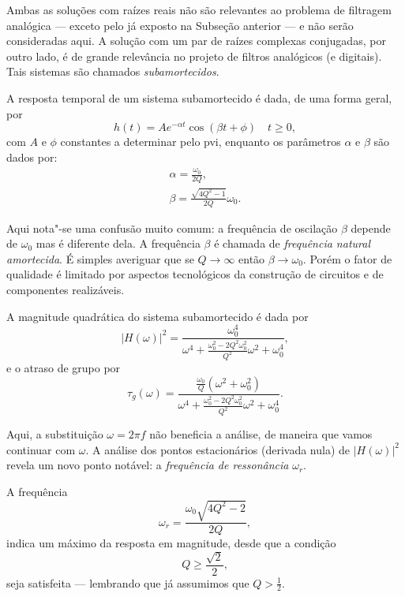 Ambas as soluções com raízes reais não são relevantes ao problema de filtragem analógica --- exceto pelo já exposto na Subseção anterior --- e não serão consideradas aqui. A solução com um par de raízes complexas conjugadas, por outro lado, é de grande relevância no projeto de filtros analógicos (e digitais). Tais sistemas são chamados \emph{subamortecidos}.

A resposta temporal de um sistema subamortecido é dada, de uma forma geral, por
\begin{equation}
	h(t)=Ae^{-\alpha t}\cos(\beta t+\phi)\quad t\geq0,
\end{equation}
com $A$ e $\phi$ constantes a determinar pelo \ac{pvi}, enquanto os parâmetros $\alpha$ e $\beta$ são dados por:
\begin{gather}
	\alpha=\frac{\omega_0}{2Q},\\
	\beta=\frac{\sqrt{4Q^2-1}}{2Q}\omega_0.
\end{gather}

Aqui nota"-se uma confusão muito comum: a frequência de oscilação $\beta$ depende de $\omega_0$ mas é diferente dela. A frequência $\beta$ é chamada de \emph{frequência natural amortecida}. É simples averiguar que se $Q\to\infty$ então $\beta\to\omega_0$. Porém o fator de qualidade é limitado por aspectos tecnológicos da construção de circuitos e de componentes realizáveis.

A magnitude quadrática do sistema subamortecido é dada por
\begin{equation}
	|H(\omega)|^2=\frac{\omega_0^4}{\displaystyle\omega^4+\frac{\omega_0^2-2Q^2\omega_0^2}{Q^2}\omega^2+\omega_0^4},
\end{equation}
e o atraso de grupo por
\begin{equation}
	\tau_g(\omega)=\frac{\displaystyle\frac{\omega_0}{Q}(\omega^2+\omega_0^2)}{\displaystyle\omega^4+\frac{\omega_0^2-2Q^2\omega_0^2}{Q^2}\omega^2+\omega_0^4}.
\end{equation}

Aqui, a substituição $\omega=2\pi f$ não beneficia a análise, de maneira que vamos continuar com $\omega$. A análise dos pontos estacionários (derivada nula) de $|H(\omega)|^2$ revela um novo ponto notável: a \emph{frequência de ressonância} $\omega_r$.

A frequência
\begin{equation}
	\omega_r=\frac{\omega_0\sqrt{4Q^2-2}}{2Q},
\end{equation}
indica um máximo da resposta em magnitude, desde que a condição
\begin{equation}
	Q\geq\frac{\sqrt{2}}{2},
\end{equation}
seja satisfeita --- lembrando que já assumimos que $Q>\frac{1}{2}$.

